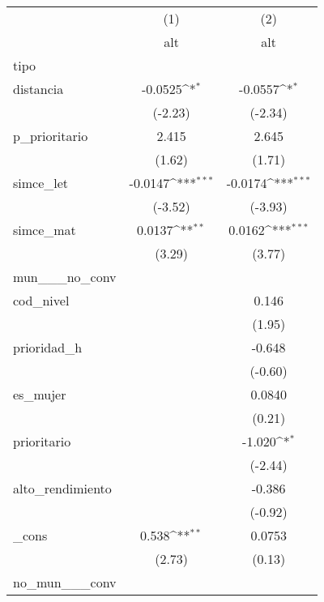 {
\def\sym#1{\ifmmode^{#1}\else\(^{#1}\)\fi}
\begin{tabular}{l*{2}{c}}
\hline\hline
            &\multicolumn{1}{c}{(1)}&\multicolumn{1}{c}{(2)}\\
            &\multicolumn{1}{c}{alt}&\multicolumn{1}{c}{alt}\\
\hline
tipo        &                     &                     \\
distancia   &     -0.0525\sym{*}  &     -0.0557\sym{*}  \\
            &     (-2.23)         &     (-2.34)         \\
[1em]
p\_prioritario&       2.415         &       2.645         \\
            &      (1.62)         &      (1.71)         \\
[1em]
simce\_let   &     -0.0147\sym{***}&     -0.0174\sym{***}\\
            &     (-3.52)         &     (-3.93)         \\
[1em]
simce\_mat   &      0.0137\sym{**} &      0.0162\sym{***}\\
            &      (3.29)         &      (3.77)         \\
\hline
mun\_\_\_no\_conv&                     &                     \\
cod\_nivel   &                     &       0.146         \\
            &                     &      (1.95)         \\
[1em]
prioridad\_h &                     &      -0.648         \\
            &                     &     (-0.60)         \\
[1em]
es\_mujer    &                     &      0.0840         \\
            &                     &      (0.21)         \\
[1em]
prioritario &                     &      -1.020\sym{*}  \\
            &                     &     (-2.44)         \\
[1em]
alto\_rendimiento&                     &      -0.386         \\
            &                     &     (-0.92)         \\
[1em]
\_cons      &       0.538\sym{**} &      0.0753         \\
            &      (2.73)         &      (0.13)         \\
\hline
no\_mun\_\_\_conv&                     &                     \\

\end{tabular}}
